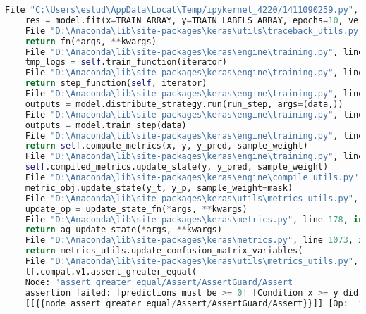 \begin{lstlisting}[language=Python]
	File "C:\Users\estud\AppData\Local\Temp/ipykernel_4220/1411090259.py", line 25, in <module>
	res = model.fit(x=TRAIN_ARRAY, y=TRAIN_LABELS_ARRAY, epochs=10, verbose=2, validation_data = (VALIDATION_ARRAY, VALIDATION_LABELS_ARRAY) )
	File "D:\Anaconda\lib\site-packages\keras\utils\traceback_utils.py", line 64, in error_handler
	return fn(*args, **kwargs)
	File "D:\Anaconda\lib\site-packages\keras\engine\training.py", line 1384, in fit
	tmp_logs = self.train_function(iterator)
	File "D:\Anaconda\lib\site-packages\keras\engine\training.py", line 1021, in train_function
	return step_function(self, iterator)
	File "D:\Anaconda\lib\site-packages\keras\engine\training.py", line 1010, in step_function
	outputs = model.distribute_strategy.run(run_step, args=(data,))
	File "D:\Anaconda\lib\site-packages\keras\engine\training.py", line 1000, in run_step
	outputs = model.train_step(data)
	File "D:\Anaconda\lib\site-packages\keras\engine\training.py", line 864, in train_step
	return self.compute_metrics(x, y, y_pred, sample_weight)
	File "D:\Anaconda\lib\site-packages\keras\engine\training.py", line 957, in compute_metrics
	self.compiled_metrics.update_state(y, y_pred, sample_weight)
	File "D:\Anaconda\lib\site-packages\keras\engine\compile_utils.py", line 459, in update_state
	metric_obj.update_state(y_t, y_p, sample_weight=mask)
	File "D:\Anaconda\lib\site-packages\keras\utils\metrics_utils.py", line 70, in decorated
	update_op = update_state_fn(*args, **kwargs)
	File "D:\Anaconda\lib\site-packages\keras\metrics.py", line 178, in update_state_fn
	return ag_update_state(*args, **kwargs)
	File "D:\Anaconda\lib\site-packages\keras\metrics.py", line 1073, in update_state
	return metrics_utils.update_confusion_matrix_variables(
	File "D:\Anaconda\lib\site-packages\keras\utils\metrics_utils.py", line 602, in update_confusion_matrix_variables
	tf.compat.v1.assert_greater_equal(
	Node: 'assert_greater_equal/Assert/AssertGuard/Assert'
	assertion failed: [predictions must be >= 0] [Condition x >= y did not hold element-wise:] [x (sequential_11/dense_2/Softmax:0) = ] [[-nan][-nan][-nan]...] [y (Cast_11/x:0) = ] [0]
	[[{{node assert_greater_equal/Assert/AssertGuard/Assert}}]] [Op:__inference_train_function_5592]
	
\end{lstlisting}